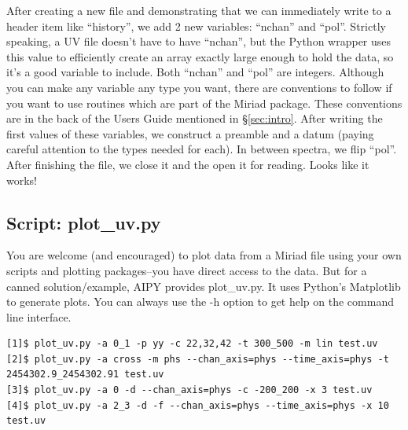 After creating a new file and demonstrating that we can immediately write to a
header item like ``history'', we add 2 new variables: ``nchan'' and ``pol''.
Strictly speaking, a UV file doesn't have to have ``nchan'', but the Python
wrapper uses this value to efficiently create an array exactly large enough to
hold the data, so it's a good variable to include.  Both ``nchan'' and ``pol''
are integers.  Although you can make any variable any type you want, there are
conventions to follow if you want to use routines which are part of the Miriad
package.  These conventions are in the back of the Users Guide mentioned in
\S\ref{sec:intro}.  After writing the first values of these variables, we
construct a preamble and a datum (paying careful attention to the types needed
for each).  In between spectra, we flip ``pol''.  After finishing the file,
we close it and the open it for reading.  Looks like it works!

\subsection{Script: plot\_uv.py}
\label{sec:plot_uv}

You are welcome (and encouraged) to plot data from a Miriad file using your
own scripts and plotting packages--you have direct access to the data.  But
for a canned solution/example, AIPY provides plot\_uv.py.  It uses Python's
Matplotlib to generate plots.  You can always use the -h option to get
help on the command line interface.

\begin{verbatim}
[1]$ plot_uv.py -a 0_1 -p yy -c 22,32,42 -t 300_500 -m lin test.uv
[2]$ plot_uv.py -a cross -m phs --chan_axis=phys --time_axis=phys -t 2454302.9_2454302.91 test.uv
[3]$ plot_uv.py -a 0 -d --chan_axis=phys -c -200_200 -x 3 test.uv
[4]$ plot_uv.py -a 2_3 -d -f --chan_axis=phys --time_axis=phys -x 10 test.uv
\end{verbatim}

